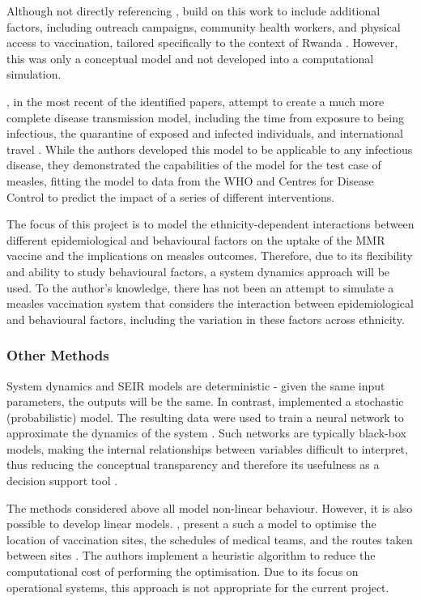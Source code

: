 \documentclass{article}
\begin{document}
Although not directly referencing \citeauthor{van2020explaining}, \citeauthor{Decouttere2021} build on this work to include additional factors, including outreach campaigns, community health workers, and physical access to vaccination, tailored specifically to the context of Rwanda \cite{Decouttere2021}. However, this was only a conceptual model and not developed into a computational simulation.

\citeauthor{zadeh2025public}, in the most recent of the identified papers, attempt to create a much more complete disease transmission model, including the time from exposure to being infectious, the quarantine of exposed and infected individuals, and international travel \cite{zadeh2025public}. While the authors developed this model to be applicable to any infectious disease, they demonstrated the capabilities of the model for the test case of measles, fitting the model to data from the WHO and Centres for Disease Control to predict the impact of a series of different interventions.

The focus of this project is to model the ethnicity-dependent interactions between different epidemiological and behavioural factors on the uptake of the MMR vaccine and the implications on measles outcomes. Therefore, due to its flexibility and ability to study behavioural factors, a system dynamics approach will be used.  To the author’s knowledge, there has not been an attempt to simulate a measles vaccination system that considers the interaction between epidemiological and behavioural factors, including the variation in these factors across ethnicity.

\subsubsection{Other Methods}
System dynamics and SEIR models are deterministic - given the same input parameters, the outputs will be the same. In contrast, \citeauthor{anwar2025stochastic} implemented a stochastic (probabilistic) model. The resulting data were used to train a neural network to approximate the dynamics of the system \cite{anwar2025stochastic}. Such networks are typically black-box models, making the internal relationships between variables difficult to interpret, thus reducing the conceptual transparency and therefore its usefulness as a decision support tool \cite{burkart2021survey}.

The methods considered above all model non-linear behaviour. However, it is also possible to develop linear models. \citeauthor{rodriguez2025heuristic}, present a such a model to optimise the location of vaccination sites, the schedules of medical teams, and the routes taken between sites \cite{rodriguez2025heuristic}. The authors implement a heuristic algorithm to reduce the computational cost of performing the optimisation. Due to its focus on operational systems, this approach is not appropriate for the current project.
\end{document}
